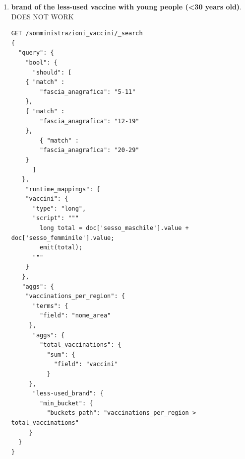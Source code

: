 \documentclass{article}
\begin{document}
\begin{enumerate}
\begin{lstlisting}
\end{lstlisting}
\item \textbf{brand of the less-used vaccine with young people (<30 years old)}.\\
DOES NOT WORK
\begin{lstlisting}
GET /somministrazioni_vaccini/_search
{
  "query": {
    "bool": {
      "should": [
	{ "match" : 
	    "fascia_anagrafica": "5-11" 
	},
	{ "match" : 
	    "fascia_anagrafica": "12-19" 
	},
        { "match" : 
	    "fascia_anagrafica": "20-29" 
	}
      ]
   },
    "runtime_mappings": {
    "vaccini": {
      "type": "long",
      "script": """
        long total = doc['sesso_maschile'].value + doc['sesso_femminile'].value;
        emit(total);
      """
    }
   },
   "aggs": {
    "vaccinations_per_region": {
      "terms": {
        "field": "nome_area"
     },
      "aggs": {
        "total_vaccinations": {
          "sum": {
            "field": "vaccini"
          }
     },
      "less-used_brand": {
        "min_bucket": {
          "buckets_path": "vaccinations_per_region > total_vaccinations" 
     }
  }
}
\end{lstlisting}
\end{enumerate}
\end{document}

